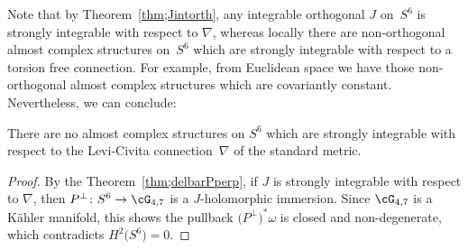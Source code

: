 Note that by Theorem~\ref{thm;Jintorth}, any integrable orthogonal $J$ on~$S^6$ is strongly integrable with respect to $\nabla$, whereas locally there are non-orthogonal almost complex structures on~$S^6$ which are strongly integrable with respect to a torsion free connection. For example, from Euclidean space we have those non-orthogonal almost complex structures which are covariantly constant. Nevertheless, we can conclude:

\begin{cor} \label{cor;noStrongJ}There are no almost complex structures on $S^6$ which are strongly integrable with respect to the Levi-Civita connection~$\nabla$ of the standard metric.
\end{cor}

\begin{proof} By the Theorem~\ref{thm;delbarPperp}, if $J$ is strongly integrable with respect to $\nabla$, then $P^\perp\colon S^6 \to \cG_{4,7}$ is a $J$-holomorphic immersion. Since $\cG_{4,7}$ is a K\"ahler manifold, this shows the pullback $\big(P^\perp \big)^*\omega$ is closed and non-degenerate, which contradicts $H^2\big(S^6\big) =0$.
\end{proof}
